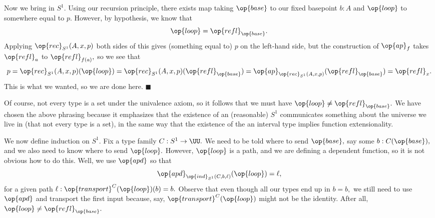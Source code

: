 Now we bring in $S^1.$ Using our recursion principle, there exists map taking $\op{base}$ to our fixed basepoint $b:A$ and $\op{loop}$ to somewhere equal to $p.$ However, by hypothesis, we know that
\[\op{loop}=\op{refl}_{\op{base}}.\]
Applying $\op{rec}_{S^1}(A,x,p)$ both sides of this gives (something equal to) $p$ on the left-hand side, but the construction of $\op{ap}_f$ takes $\op{refl}_a$ to $\op{refl}_{f(a)},$ so we see that
\[p=\op{rec}_{S^1}(A,x,p)(\op{loop})=\op{rec}_{S^1}(A,x,p)(\op{refl}_{\op{base}})=\op{ap}_{\op{rec}_{S^1}(A,x,p)}(\op{refl}_{\op{base}})=\op{refl}_x.\]
This is what we wanted, so we are done here. $\blacksquare$

Of course, not every type is a set under the univalence axiom, so it follows that we must have $\op{loop}\ne\op{refl}_{\op{base}}.$ We have chosen the above phrasing because it emphasizes that the existence of an (reasonable) $S^1$ communicates something about the universe we live in (that not every type is a set), in the same way that the existence of the an interval type implies function extensionality.

We now define induction on $S^1.$ Fix a type family $C:S^1\to\UU.$ We need to be told where to send $\op{base},$ say some $b:C(\op{base}),$ and we also need to know where to send $\op{loop}.$ However, $\op{loop}$ is a path, and we are defining a dependent function, so it is not obvious how to do this. Well, we use $\op{apd}$ so that
\[\op{apd}_{\op{ind}_{S^1}(C,b,\ell)}(\op{loop})=\ell,\]
for a given path $\ell:\op{transport}^C(\op{loop})(b)=b.$ Observe that even though all our types end up in $b=b,$ we still need to use $\op{apd}$ and transport the first input because, say, $\op{transport}^C(\op{loop})$ might not be the identity. After all, $\op{loop}\ne\op{refl}_{\op{base}}.$

